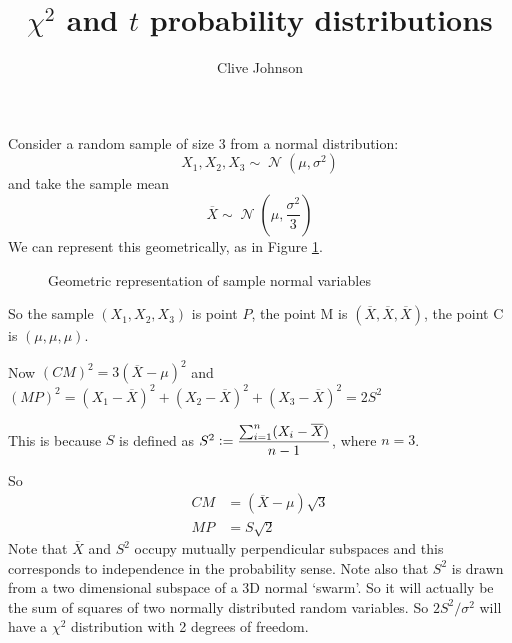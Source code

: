 \documentclass[fleqn,a4paper,11pt]{article}
\title{\(\chi^2\) and \(t\) probability distributions}
\author{Clive Johnson}
\DeclareMathOperator{\Normal}{\mathcal N}
\newcommand{\defeq}{\vcentcolon=}
\newcommand*\mean[1]{\overline{#1}}
\begin{document}
\maketitle

Consider a random sample of size \(3\) from a normal distribution:
\begin{equation*}
X_1,X_2,X_3 \sim \Normal(\mu, \sigma^2)
\end{equation*}
and take the sample mean
\begin{equation*}
\mean X \sim \Normal(\mu, \frac{\sigma^2}{3})
\end{equation*}
We can represent this geometrically, as in Figure \ref{fig_1}.

\begin{figure}[h]
\begin{center}
\end{center}
\caption{Geometric representation of sample normal variables}
\label{fig_1}
\end{figure}

So the sample \((X_1, X_2, X_3)\) is point \(P\), the point M is
\((\mean X, \mean X, \mean X)\), the point C is
\((\mu, \mu, \mu)\).

Now \((CM)^2 = 3(\mean X - \mu)^2\) and \\
\((MP)^2 =
  (X_1 - \mean X)^2 + (X_2 - \mean X)^2 + (X_3 - \mean X)^2 =
  2S^2\)

This is because \(S\) is defined as
\(S^2 \defeq \dfrac{\sum_{i=1}^n(X_i - \mean X)}{n - 1}\), where \(n = 3\).

So
\begin{align*}
CM &= (\mean X - \mu)\sqrt 3 \\
MP &= S \sqrt 2
\end{align*}
Note that \(\mean X\) and \(S^2\) occupy mutually perpendicular subspaces
and this corresponds to independence in the probability sense. Note also that
\(S^2\) is drawn from a two dimensional subspace of a 3D normal `swarm'. So it
will actually be the sum of squares of two normally distributed random
variables. So \(2S^2/\sigma^2\) will have a \(\chi^2\) distribution with 2
degrees of freedom.
\end{document}
